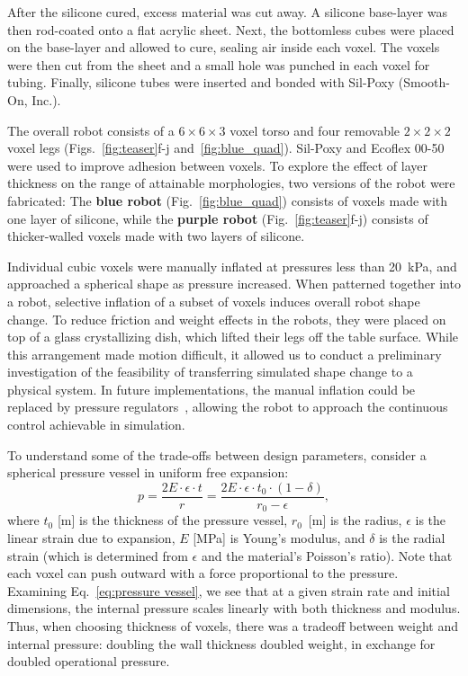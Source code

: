 After the silicone cured, excess material was cut away. A silicone base-layer was then rod-coated onto a flat acrylic sheet. Next, the bottomless cubes were placed on the base-layer and allowed to cure, sealing air inside each voxel. The voxels were then cut from the sheet and a small hole was punched in each voxel for tubing. Finally, silicone tubes were inserted and bonded with Sil-Poxy (Smooth-On, Inc.).

The overall robot consists of a $6\times6\times3$ voxel torso and four removable $2\times2\times2$ voxel legs (Figs.~\ref{fig:teaser}f-j  and~\ref{fig:blue_quad}). 
Sil-Poxy and Ecoflex 00-50 were used to improve adhesion between voxels. 
To explore the effect of layer thickness on the range of attainable morphologies,
two versions of the robot were fabricated:
The {\color{blue}\textbf{blue robot}} (Fig.~\ref{fig:blue_quad}) consists of voxels made with one layer of silicone, while the {\color{purple}\textbf{purple robot}} \mbox{(Fig.~\ref{fig:teaser}f-j)} consists of thicker-walled voxels made with two layers of silicone. 

Individual cubic voxels were manually inflated at pressures less than 20~kPa, and approached a spherical shape as pressure increased. 
When patterned together into a robot, selective inflation of a subset of voxels induces overall robot shape change. 
To reduce friction and weight effects in the robots, they were placed on top of a glass crystallizing dish, which lifted their legs off the table surface.
While this arrangement made motion difficult, it allowed us to conduct a preliminary investigation of the feasibility of transferring simulated shape change to a physical system. 
In future implementations, the manual inflation could be replaced by pressure regulators~\cite{booth_addressable_2018}, allowing the robot to approach the continuous control achievable in simulation.

To understand some of the trade-offs between design parameters, consider a spherical pressure vessel in uniform free expansion:
\begin{equation}
    \label{eq:pressure vessel}
    p=\frac{2 E \cdot \epsilon \cdot t}{r} = \frac{2 E \cdot \epsilon \cdot t_0 \cdot (1-\delta)}{r_0-\epsilon},
\end{equation}
where $t_0$ [m] is the thickness of the pressure vessel, $r_0$~[m] is the radius, $\epsilon$ is the linear strain due to expansion, $E$ [MPa] is Young's modulus, and $\delta$ is the radial strain (which is determined from $\epsilon$ and the material's Poisson's ratio).
Note that each voxel can push outward with a force proportional to the pressure. Examining Eq.~\ref{eq:pressure vessel}, we see that at a given strain rate and initial dimensions, the internal pressure scales linearly with both thickness and modulus. Thus, when choosing thickness of voxels, there was a tradeoff between weight and internal pressure: doubling the wall thickness doubled weight, in exchange for doubled operational pressure.



